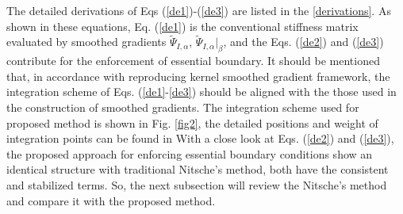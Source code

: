 The detailed derivations of Eqs (\ref{de1})-(\ref{de3}) are listed in the \ref{derivations}. As shown in these equations, Eq. (\ref{de1}) is the conventional stiffness matrix evaluated by smoothed gradients $\tilde \Psi_{I,\alpha}$, $\tilde \Psi_{I,\alpha}\vert_\beta$, and the Eqs. (\ref{de2}) and (\ref{de3}) contribute for the enforcement of essential boundary. It should be mentioned that, in accordance with reproducing kernel smoothed gradient framework, the integration scheme of Eqs. (\ref{de1}-\ref{de3}) should be aligned with the those used in the construction of smoothed gradients. The integration scheme used for proposed method is shown in Fig. \ref{fig2}, the detailed positions and weight of integration points can be found in \cite{du2022}  With a close look at Eqs. (\ref{de2}) and (\ref{de3}), the proposed approach for enforcing essential boundary conditions show an identical structure with traditional Nitsche's method, both have the consistent and stabilized terms. So, the next subsection will review the Nitsche's method and compare it with the proposed method.

